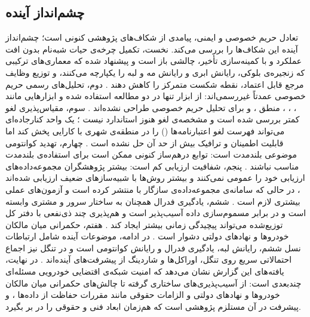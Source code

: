 \subsection{چشم‌انداز آینده}

تعادل حریم خصوصی و ایمنی، پیامدی از شکاف‌های پژوهشی کنونی است؛ چشم‌انداز آینده این شکاف‌ها را بررسی می‌کند. نخست، تکمیل چرخه‌ی حیات شبه‌نام بدون افت عملکرد و با کمینه‌سازی تأخیر، چالشی باز است \cite{rahmawatiagustinaSystematicLiteratureReview2025} و پیشنهاد شده که معماری‌های ترکیبی که زنجیره‌ی بلوکی، رایانش ابری و رایانش مه و لبه را یکپارچه می‌کنند، و توزیع وظایف مرجع قابل اعتماد، نقطه شکست متمرکز را کاهش دهند \cite{rahmawatiagustinaSystematicLiteratureReview2025}. دوم، تحلیل‌های رسمی حریم خصوصی عمدتاً غیررسمی‌اند: از ابزار  تنها در دو مطالعه استفاده شده و ابزارهایی مانند ، ، ، منطق ،  و  برای تحلیل حریم خصوصی طراحی نشده‌اند \cite{rahmawatiagustinaSystematicLiteratureReview2025}. سوم، مقیاس‌پذیری لغو کمتر بررسی شده است و مشخصه‌ی لغو  هنوز استاندارد نیست \cite{mazzocca2025survey}؛ یک واحد کنارجاده‌ای می‌تواند فهرست لغو اعتبارنامه‌ها () را در منطقه‌ی شهری با کارایی پخش کند اما قابلیت اطمینان و ترافیک بیش از حد آن حل نشده است \cite{farsimadanReviewSecurityChallenges2025}. چهارم، تهدید کوانتومی موضوعی بلندمدت است: توابع درهم‌ساز کنونی ممکن است برای استفاده‌ی بلندمدت مناسب نباشند \cite{rahmawatiagustinaSystematicLiteratureReview2025}. پنجم، شفافیت ارزیابی کم است: بیشتر پژوهشگران مجموعه‌داده‌های ارزیابی خود را عمومی نمی‌کنند و بیشتر روش‌ها با شبیه‌سازهای ضعیف ارزیابی شده‌اند \cite{farsimadanReviewSecurityChallenges2025}، در حالی که سامانه‌ی  مجموعه‌داده‌ی سازگار با  منتشر کرده است \cite{feraudoDIVADIDbasedReputation2024} و آزمون‌های عملی بیشتری لازم است \cite{luPseudonymChangingSocial2012}. ششم، یادگیری فدرال همچنان به ساختار سرور و مشتری وابسته است و در برابر مسموم‌سازی داده آسیب‌پذیر است \cite{farsimadanReviewSecurityChallenges2025} و هم‌پذیری چند ذی‌نفعی با دفتر کل توزیع‌شده می‌تواند پیچیدگی زمانی بیشتر ایجاد کند \cite{farsimadanReviewSecurityChallenges2025}. هفتم، حکمرانی میان مالکان خودروها و نهادهای دولتی دشوار است \cite{razaBlockchainBasedReputationTrust2024}. در ادامه، موضوعات آینده شامل ارتباطات  نسل ششم، رایانش لبه، یادگیری فدرال و رایانش کوانتومی است \cite{hozouriOverviewVANETVehicular2023} و در تنگل نیز اجماع احتمالاتی سریع روی تنگل، اوراکل‌ها و شاردینگ از پیشرفت‌های آینده‌اند \cite{sealeyIOTATangle202022}. در نهایت، یافته‌های این گزارش نشان می‌دهد که امنیت شبکه‌ی اقتضایی خودرویی مسئله‌ای چندبعدی است: از آسیب‌پذیری‌های ساختاری گرفته تا چالش‌های حکمرانی میان مالکان خودروها و نهادهای دولتی \cite{razaBlockchainBasedReputationTrust2024} و الزامات حقوقی مانند مقررات حفاظت از داده‌ها \cite{mazzocca2025survey}، و پیشرفت در آن مستلزم پژوهشی است که هم‌زمان ابعاد فنی و حقوقی را در بر بگیرد.
